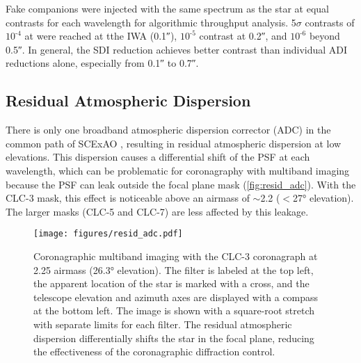Fake companions were injected with the same spectrum as the star at equal contrasts for each wavelength for algorithmic throughput analysis. 5$\sigma$ contrasts of $10^{\text{-}4}$ at were reached at tthe IWA (\ang{;;0.1}), $10^{\text{-}5}$ contrast at \ang{;;0.2}, and $10^{\text{-}6}$ beyond \ang{;;0.5}. In general, the SDI reduction achieves better contrast than individual ADI reductions alone, especially from \ang{;;0.1} to \ang{;;0.7}.

\subsection{Residual Atmospheric Dispersion}

There is only one broadband atmospheric dispersion corrector (ADC) in the common path of SCExAO \citep{egner_atmospheric_2010}, resulting in residual atmospheric dispersion at low elevations. This dispersion causes a differential shift of the PSF at each wavelength, which can be problematic for coronagraphy with multiband imaging because the PSF can leak outside the focal plane mask (\autoref{fig:resid_adc}). With the CLC-3 mask, this effect is noticeable above an airmass of $\sim$\num{2.2} ($<$\ang{27} elevation). The larger masks (CLC-5 and CLC-7) are less affected by this leakage.

\begin{figure}
    \centering
    \texttt{[image: figures/resid\_adc.pdf]}
    \caption{Coronagraphic multiband imaging with the CLC-3 coronagraph at 2.25 airmass (\ang{26.3} elevation). The filter is labeled at the top left, the apparent location of the star is marked with a cross, and the telescope elevation and azimuth axes are displayed with a compass at the bottom left. The image is shown with a square-root stretch with separate limits for each filter. The residual atmospheric dispersion differentially shifts the star in the focal plane, reducing the effectiveness of the coronagraphic diffraction control.\label{fig:resid_adc}}
\end{figure}
